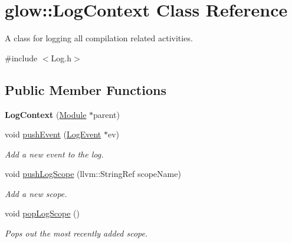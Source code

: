 \hypertarget{classglow_1_1_log_context}{}\section{glow\+:\+:Log\+Context Class Reference}
\label{classglow_1_1_log_context}


A class for logging all compilation related activities.  




{\ttfamily \#include $<$Log.\+h$>$}

\subsection*{Public Member Functions}
\begin{DoxyCompactItemize}
\item 
\mbox{\label{classglow_1_1_log_context_a2c79fee01dad0613508a0c7d5880f236}} 
{\bfseries Log\+Context} (\hyperlink{classglow_1_1_module}{Module} $\ast$parent)
\item 
\mbox{\label{classglow_1_1_log_context_a3598792cb8cf2edc300e7119551d74b3}} 
void \hyperlink{classglow_1_1_log_context_a3598792cb8cf2edc300e7119551d74b3}{push\+Event} (\hyperlink{structglow_1_1_log_event}{Log\+Event} $\ast$ev)
\begin{DoxyCompactList}\small\item\em Add a new event to the log. \end{DoxyCompactList}\item 
\mbox{\label{classglow_1_1_log_context_ab63daf2e961fe626da6cd2842d25748d}} 
void \hyperlink{classglow_1_1_log_context_ab63daf2e961fe626da6cd2842d25748d}{push\+Log\+Scope} (llvm\+::\+String\+Ref scope\+Name)
\begin{DoxyCompactList}\small\item\em Add a new scope. \end{DoxyCompactList}\item 
\mbox{\label{classglow_1_1_log_context_ae4099fbfa9ec2254b000685e7d646298}} 
void \hyperlink{classglow_1_1_log_context_ae4099fbfa9ec2254b000685e7d646298}{pop\+Log\+Scope} ()
\begin{DoxyCompactList}\small\item\em Pops out the most recently added scope. \end{DoxyCompactList}\item 

\end{DoxyCompactItemize}
